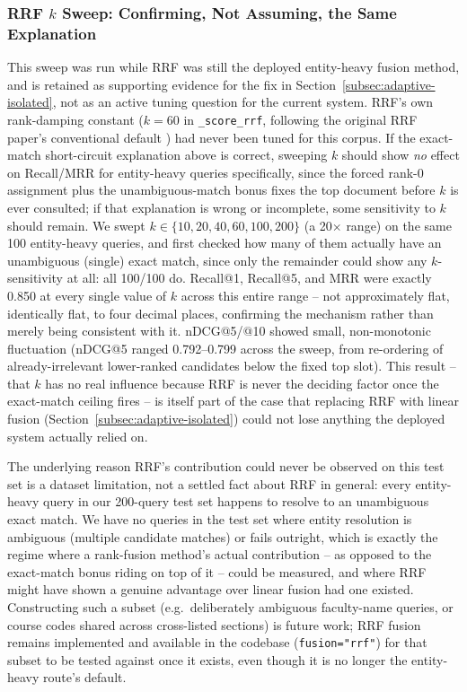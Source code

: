\documentclass[a4paper,twoside]{article}
\begin{document}
\subsubsection{RRF $k$ Sweep: Confirming, Not Assuming, the Same Explanation}
\label{subsec:rrf-k-sweep}

This sweep was run while RRF was still the deployed entity-heavy fusion method, and is retained as supporting evidence for the fix in Section~\ref{subsec:adaptive-isolated}, not as an active tuning question for the current system. RRF's own rank-damping constant ($k=60$ in \texttt{\_score\_rrf}, following the original RRF paper's conventional default \citep{cormack2009}) had never been tuned for this corpus. If the exact-match short-circuit explanation above is correct, sweeping $k$ should show \emph{no} effect on Recall/MRR for entity-heavy queries specifically, since the forced rank-0 assignment plus the unambiguous-match bonus fixes the top document before $k$ is ever consulted; if that explanation is wrong or incomplete, some sensitivity to $k$ should remain. We swept $k\in\{10,20,40,60,100,200\}$ (a 20$\times$ range) on the same 100 entity-heavy queries, and first checked how many of them actually have an unambiguous (single) exact match, since only the remainder could show any $k$-sensitivity at all: all 100/100 do. Recall@1, Recall@5, and MRR were exactly 0.850 at every single value of $k$ across this entire range -- not approximately flat, identically flat, to four decimal places, confirming the mechanism rather than merely being consistent with it. nDCG@5/@10 showed small, non-monotonic fluctuation (nDCG@5 ranged 0.792--0.799 across the sweep, from re-ordering of already-irrelevant lower-ranked candidates below the fixed top slot). This result -- that $k$ has no real influence because RRF is never the deciding factor once the exact-match ceiling fires -- is itself part of the case that replacing RRF with linear fusion (Section~\ref{subsec:adaptive-isolated}) could not lose anything the deployed system actually relied on.

The underlying reason RRF's contribution could never be observed on this test set is a dataset limitation, not a settled fact about RRF in general: every entity-heavy query in our 200-query test set happens to resolve to an unambiguous exact match. We have no queries in the test set where entity resolution is ambiguous (multiple candidate matches) or fails outright, which is exactly the regime where a rank-fusion method's actual contribution -- as opposed to the exact-match bonus riding on top of it -- could be measured, and where RRF might have shown a genuine advantage over linear fusion had one existed. Constructing such a subset (e.g.\ deliberately ambiguous faculty-name queries, or course codes shared across cross-listed sections) is future work; RRF fusion remains implemented and available in the codebase (\texttt{fusion="rrf"}) for that subset to be tested against once it exists, even though it is no longer the entity-heavy route's default.
\end{document}
